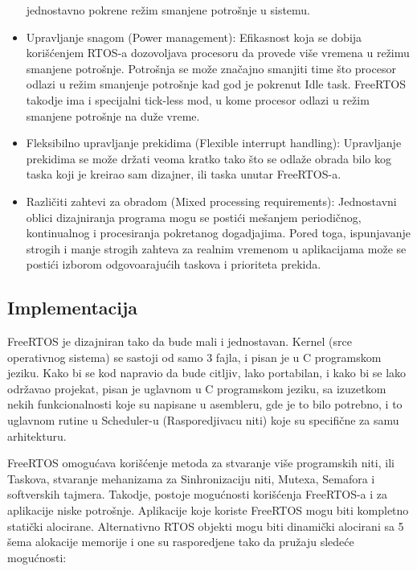 \documentclass[a4paper,12pt, master]{etf}
\begin{document}
\begin{itemize}
		jednostavno pokrene re\v{z}im smanjene potro\v{s}nje u sistemu.
		\item Upravljanje snagom (Power management):
		Efikasnost koja se dobija kori\v{s}\'{c}enjem RTOS-a dozovoljava procesoru da provede vi\v{s}e
		vremena	u re\v{z}imu smanjene potro\v{s}nje. Potro\v{s}nja se mo\v{z}e zna\v{c}ajno smanjiti time
		\v{s}to procesor odlazi u re\v{z}im smanjenje potro\v{s}nje kad god je pokrenut Idle task. FreeRTOS
		takodje ima i specijalni tick-less mod, u kome procesor odlazi u re\v{z}im smanjene
		potro\v{s}nje na du\v{z}e vreme.
		\item Fleksibilno upravljanje prekidima (Flexible interrupt handling):
		Upravljanje prekidima se mo\v{z}e dr\v{z}ati veoma kratko tako \v{s}to se odla\v{z}e obrada bilo kog
		taska koji je kreirao sam dizajner, ili taska unutar FreeRTOS-a.
		\item Razli\v{c}iti zahtevi za obradom (Mixed processing requirements):
		Jednostavni oblici dizajniranja programa mogu se posti\'{c}i me\v{s}anjem periodi\v{c}nog,
		kontinualnog i procesiranja pokretanog dogadjajima. Pored toga, ispunjavanje strogih i
		manje strogih zahteva za realnim vremenom u aplikacijama mo\v{z}e se posti\'{c}i izborom
		odgovoaraju\'{c}ih taskova i prioriteta prekida.

	\end{itemize}

	\subsection{Implementacija}

	FreeRTOS je dizajniran tako da bude mali i jednostavan. Kernel (srce operativnog sistema)
	se sastoji od samo 3 fajla, i pisan je u C programskom jeziku. Kako bi se kod napravio da
	bude citljiv, lako portabilan, i kako bi se lako odr\v{z}avao projekat, pisan je uglavnom u C
	programskom jeziku, sa izuzetkom nekih funkcionalnosti koje su napisane u asembleru, gde je to
	bilo potrebno, i to uglavnom rutine u Scheduler-u (Rasporedjivacu niti) koje su specifi\v{c}ne
	za samu arhitekturu.

	FreeRTOS omogu\'{c}ava kori\v{s}\'{c}enje metoda za stvaranje vi\v{s}e programskih niti,
	ili Taskova, stvaranje mehanizama za Sinhronizaciju niti, Mutexa, Semafora i softverskih tajmera.
	Takodje, postoje mogu\'{c}nosti kori\v{s}\'{c}enja FreeRTOS-a i za aplikacije niske potro\v{s}nje.
	Aplikacije koje koriste FreeRTOS mogu biti kompletno stati\v{c}ki alocirane. Alternativno
	RTOS objekti mogu biti dinami\v{c}ki alocirani sa 5 \v{s}ema alokacije memorije i one su rasporedjene
	tako da pru\v{z}aju slede\'{c}e mogu\'{c}nosti:
\end{document}
